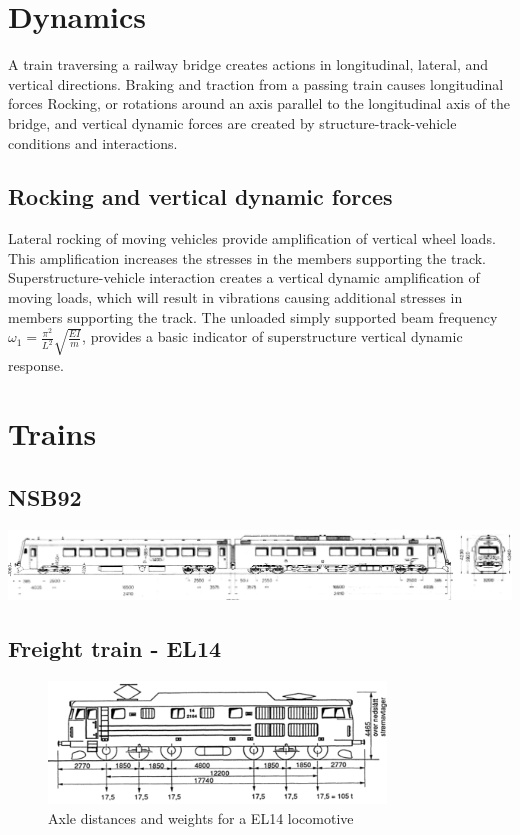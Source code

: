 \section{Dynamics}
A train traversing a railway bridge creates actions in longitudinal, lateral, and vertical directions. Braking and traction from a passing train causes longitudinal forces
Rocking, or rotations around an axis parallel to the longitudinal axis of the bridge, and vertical dynamic forces are created by structure-track-vehicle conditions and interactions.
\subsection{Rocking and vertical dynamic forces}
Lateral rocking of moving vehicles provide amplification of vertical  wheel loads. This amplification increases the stresses in the members supporting the track.
%
Superstructure-vehicle interaction creates a vertical dynamic amplification of moving loads, which will result in vibrations causing additional stresses in members supporting the track.
%
The unloaded simply supported beam frequency $\omega_1 = \frac{\pi^2}{L^2}\sqrt{\frac{EI}{m}}$, provides a basic indicator of superstructure vertical dynamic response.
%
\section{Trains}
\subsection{NSB92}
\label{appendix:nsb92}
\includegraphics[width=0.8\pageheight, height=0.5\pagewidth, angle=270]{./figures/nsb92.png}
\subsection{Freight train - EL14}
\label{appendix:el14}
\begin{figure}[H]
  \includegraphics[width=0.8\textwidth]{./figures/EL14.png}
  \caption{Axle distances and weights for a EL14 locomotive}
  \label{figure:el14_locomotive}
\end{figure}

